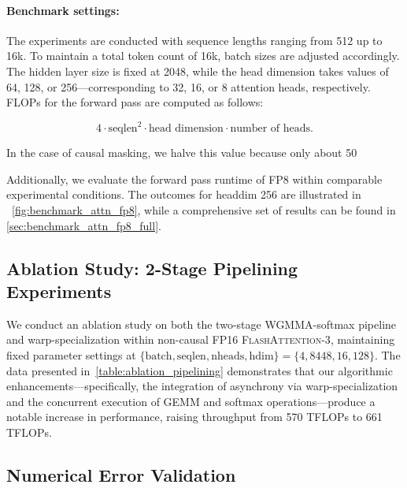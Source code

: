 \paragraph{Benchmark settings:} The experiments are conducted with sequence lengths ranging from 512 up to 16k. To maintain a total token count of 16k, batch sizes are adjusted accordingly. The hidden layer size is fixed at 2048, while the head dimension takes values of 64, 128, or 256—corresponding to 32, 16, or 8 attention heads, respectively. FLOPs for the forward pass are computed as follows:

\begin{equation*}
  4 \cdot \text{seqlen}^2 \cdot \text{head dimension} \cdot \text{number of heads}.
\end{equation*}

In the case of causal masking, we halve this value because only about 50%

Additionally, we evaluate the forward pass runtime of FP8 within comparable experimental conditions. The outcomes for headdim 256 are illustrated in ~\cref{fig:benchmark_attn_fp8}, while a comprehensive set of results can be found in \cref{sec:benchmark_attn_fp8_full}.

\subsection{Ablation Study: 2-Stage Pipelining Experiments}
\label{sec:2-stage-pipelining-experiments}

We conduct an ablation study on both the two-stage WGMMA-softmax pipeline and warp-specialization within non-causal FP16 \textsc{FlashAttention-3}, maintaining fixed parameter settings at $\{\text{batch}, \text{seqlen}, \text{nheads}, \text{hdim}\} = \{ 4, 8448, 16, 128\}$. The data presented in~\cref{table:ablation_pipelining} demonstrates that our algorithmic enhancements—specifically, the integration of asynchrony via warp-specialization and the concurrent execution of GEMM and softmax operations—produce a notable increase in performance, raising throughput from 570 TFLOPs to 661 TFLOPs.

\subsection{Numerical Error Validation}
\label{sec:numerical_error}

